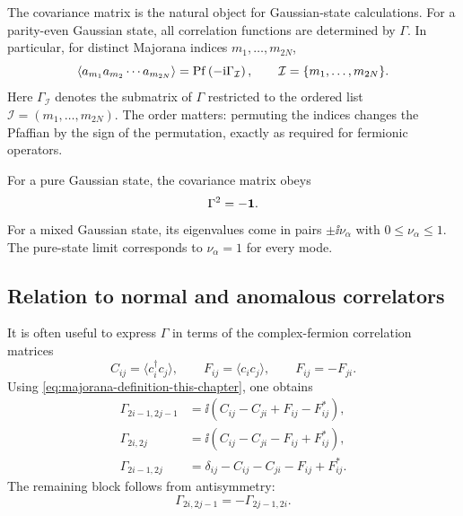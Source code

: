The covariance matrix is the natural object for Gaussian-state calculations.
For a parity-even Gaussian state, all correlation functions are determined by
$\Gamma$.  In particular, for distinct Majorana indices
$m_1,\ldots,m_{2N}$,
\begin{equation}
\label{eq:majorana-product-pfaffian-gamma}
    \left\langle a_{m_1}a_{m_2}\cdots a_{m_{2N}}\right\rangle
    =
    \operatorname{Pf}\left(-\mathrm{i}\Gamma_{\mathcal{I}}\right),
    \qquad
    \mathcal{I}=\{m_1,\ldots,m_{2N}\}.
\end{equation}
Here $\Gamma_{\mathcal{I}}$ denotes the submatrix of $\Gamma$ restricted to the
ordered list $\mathcal{I}=(m_1,\ldots,m_{2N})$.  The order matters: permuting the
indices changes the Pfaffian by the sign of the permutation, exactly as required
for fermionic operators.

\begin{remark}
For a pure Gaussian state, the covariance matrix obeys
\begin{equation}
\label{eq:pure-gaussian-gamma-square}
    \Gamma^2=-\mathbf{1}.
\end{equation}
For a mixed Gaussian state, its eigenvalues come in pairs $\pm \ii\nu_\alpha$ with
$0\leq \nu_\alpha\leq1$.  The pure-state limit corresponds to
$\nu_\alpha=1$ for every mode.
\end{remark}

\subsection*{Relation to normal and anomalous correlators}

It is often useful to express $\Gamma$ in terms of the complex-fermion
correlation matrices
\begin{equation}
\label{eq:normal-anomalous-correlators-definition}
    C_{ij}=\langle c_i^\dagger c_j\rangle,
    \qquad
    F_{ij}=\langle c_i c_j\rangle,
    \qquad
    F_{ij}=-F_{ji}.
\end{equation}
Using \cref{eq:majorana-definition-this-chapter}, one obtains
\begin{align}
\label{eq:gamma-block-odd-odd}
    \Gamma_{2i-1,2j-1}
    &=
    \ii\left(C_{ij}-C_{ji}+F_{ij}-F_{ij}^*\right),\\
\label{eq:gamma-block-even-even}
    \Gamma_{2i,2j}
    &=
    \ii\left(C_{ij}-C_{ji}-F_{ij}+F_{ij}^*\right),\\
\label{eq:gamma-block-odd-even}
    \Gamma_{2i-1,2j}
    &=
    \delta_{ij}-C_{ij}-C_{ji}-F_{ij}+F_{ij}^*.
\end{align}
The remaining block follows from antisymmetry:
\begin{equation}
    \Gamma_{2i,2j-1}=-\Gamma_{2j-1,2i}.
\end{equation}

